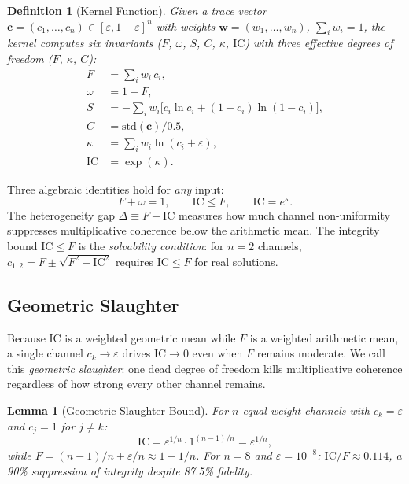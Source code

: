 \documentclass[
  aps,
  prd,
  twocolumn,
  superscriptaddress,
  nofootinbib,
  floatfix
]{revtex4-2}
\newtheorem{definition}[theorem]{Definition}
\newtheorem{lemma}[theorem]{Lemma}
\newcommand{\eps}{\varepsilon}
\newcommand{\beq}{\begin{equation}}
\newcommand{\eeq}{\end{equation}}
\newcommand{\tvec}{\mathbf{c}}
\newcommand{\wvec}{\mathbf{w}}
\newcommand{\IC}{\mathrm{IC}}
\begin{document}
\begin{definition}[Kernel Function]\label{def:kernel}
Given a trace vector $\tvec = (c_1, \ldots, c_n) \in
[\eps, 1{-}\eps]^n$ with weights $\wvec = (w_1, \ldots, w_n)$,
$\sum_i w_i = 1$, the kernel computes six invariants
($F$, $\omega$, $S$, $C$, $\kappa$, $\IC$) with three
effective degrees of freedom ($F$, $\kappa$, $C$):
\begin{align}
  F &= \textstyle\sum_i w_i \, c_i, \label{eq:F} \\
  \omega &= 1 - F, \label{eq:omega} \\
  S &= -\textstyle\sum_i w_i \bigl[c_i \ln c_i
       + (1{-}c_i)\ln(1{-}c_i)\bigr], \label{eq:S} \\
  C &= \mathrm{std}(\tvec) / 0.5, \label{eq:C} \\
  \kappa &= \textstyle\sum_i w_i \ln(c_i + \eps), \label{eq:kappa} \\
  \IC &= \exp(\kappa). \label{eq:IC}
\end{align}
\end{definition}

\noindent Three algebraic identities hold for \emph{any} input:
\beq\label{eq:tier1}
  F + \omega = 1, \qquad
  \IC \leq F, \qquad
  \IC = e^{\kappa}.
\eeq
The heterogeneity gap $\Delta \equiv F - \IC$
measures how much channel non-uniformity
suppresses multiplicative coherence below the arithmetic
mean.  The integrity bound $\IC \leq F$ is the
\emph{solvability condition}: for $n{=}2$ channels,
$c_{1,2} = F \pm \sqrt{F^2 - \IC^2}$ requires
$\IC \leq F$ for real solutions.

\subsection{Geometric Slaughter}\label{sec:slaughter}

Because $\IC$ is a weighted geometric mean while $F$
is a weighted arithmetic mean, a single channel
$c_k \to \eps$ drives $\IC \to 0$ even when $F$
remains moderate.  We call this \emph{geometric
slaughter}: one dead degree of freedom kills
multiplicative coherence regardless of how strong
every other channel remains.

\begin{lemma}[Geometric Slaughter Bound]\label{lem:slaughter}
For $n$ equal-weight channels with $c_k = \eps$ and
$c_j = 1$ for $j \neq k$:
\beq
  \IC = \eps^{1/n} \cdot 1^{(n-1)/n} = \eps^{1/n},
\eeq
while $F = (n-1)/n + \eps/n \approx 1 - 1/n$.
For $n{=}8$ and $\eps = 10^{-8}$: $\IC/F \approx 0.114$,
a 90\% suppression of integrity despite 87.5\% fidelity.
\end{lemma}
\end{document}
